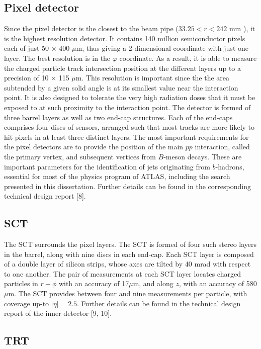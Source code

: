 \subsection*{Pixel detector}
Since the pixel detector is the closest to the beam pipe ($33.25 < r <242$ mm ), it is
the highest resolution detector. It contains 140 million semiconductor pixels each of just
50 $\times$ 400 $\mu$m, 
thus giving a 2-dimensional coordinate with just one layer. The best resolution is in the $\varphi$ coordinate. 
As a result, it is able to measure the charged particle track intersection 
position at the different layers  up
to a precision of 10 $\times$ 115 $\mu$m.
This resolution is important since the 
the area subtended by a given solid angle is at its smallest value near the interaction point.
 It is also designed to tolerate the very high radiation
doses that it must be exposed to at such proximity to the interaction point. The detector is
formed of three barrel layers as well as two end-cap structures. Each of the end-caps
comprises four discs of sensors, arranged such that most tracks are more likely to hit pixels in at
least three distinct layers.
The most important requirements for the pixel detectors are to provide the position of the main $pp$
interaction, called the primary vertex, and subsequent vertices from 
$B$-meson decays. These are important parameters for the identification of jets originating from $b$-hadrons,
essential for most of the physics program of ATLAS, including the search presented in this dissertation. 
 Further details can be found in the corresponding technical design report [8].


\subsection*{SCT}

The SCT surrounds the pixel layers.
The SCT is formed of four such stereo layers in the barrel,
along with nine discs in each end-cap. 
Each SCT layer is composed of a double layer of silicon
strips, whose axes are tilted by 40 mrad with respect to one another. The pair of measurements at
each SCT layer locates charged particles in $r - \phi$ with an accuracy of 17$\mu$m, 
and along $z$, with an accuracy of 580 $\mu$m.
The SCT provides between four and nine measurements per particle, with
coverage up-to $|\eta|=2.5$.
Further details can be found in the technical design report of the inner
detector [9, 10].


\subsection*{TRT}

